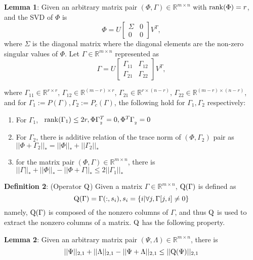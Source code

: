 \documentclass[twoside,leqno,twocolumn]{article}
\begin{document}
\noindent \textbf{Lemma 1}: Given an arbitrary matrix pair $(\Phi,\Gamma)\in{\mathbb{R}^{m\times n}}$
with ${\rm {rank}}(\Phi)=r$, and the SVD of $\Phi$ is 
\[
\Phi=U\left[{\begin{array}{cc}
\Sigma & 0\\
0 & 0
\end{array}}\right]{V^{T}},
\]
where $\varSigma$ is the diagonal matrix where the diagonal elements
are the non-zero singular values of $\Phi$. Let $\Gamma\in{\mathbb{R}^{m\times n}}$
represented as 
\[
\Gamma=U\left[{\begin{array}{cc}
{\Gamma_{11}} & {\Gamma_{12}}\\
{\Gamma_{21}} & {\Gamma_{22}}
\end{array}}\right]{V^{T}},
\]


where $\Gamma_{11}\in{\mathbb{R}^{r\times r}}$, $\Gamma_{12}\in{\mathbb{R}^{(m-r)\times r}}$,
$\Gamma_{21}\in{\mathbb{R}^{r\times(n-r)}}$, $\Gamma_{22}\in{\mathbb{R}^{(m-r)\times(n-r)}}$,
and for $\Gamma_{1}:={P(\Gamma)},\Gamma_{2}:={P_{c}(\Gamma)}$, the
following hold for $\Gamma_{1},\Gamma_{2}$ respectively:
\begin{enumerate}
\item For $\Gamma_{1}$, $\begin{array}{l}
{\rm rank}({\Gamma_{1}})\le2r,\Phi\Gamma_{_{2}}^{T}=0,{\Phi^{T}}\Gamma_{_{2}}^ {}=0\end{array}$
\item For $\Gamma_{2}$, there is additive relation of the trace norm of
$(\Phi,\Gamma_{2})$ pair as $||\Phi+{\Gamma_{2}}|{|_{*}}=||\Phi|{|_{*}}+||{\Gamma_{2}}|{|_{*}}$
\item for the matrix pair $(\Phi,\Gamma)\in{\mathbb{R}^{m\times n}}$, there
is $||\Gamma|{|_{*}}+||\Phi|{|_{*}}-||\Phi+\Gamma|{|_{*}}\le2||{\Gamma_{1}}|{|_{*}}$
\end{enumerate}


\noindent \textbf{Definition 2}: (Operator ${\rm Q}$) Given a matrix $\Gamma\in{\mathbb{R}^{m\times n}}$, ${\rm Q (\Gamma)}$ is defined as
\[{\rm{Q}}(\Gamma ) = \Gamma (:,{s_i}),{s_i} = \left\{ {i|\forall j,\Gamma [j,i] \ne 0} \right\}\]
%
namely, ${\rm Q (\Gamma)}$ is composed of the nonzero columns of $\Gamma$, and thus ${\rm Q}$ is used to extract the nonzero columns of a matrix. ${\rm Q}$ has the following property.

\noindent \textbf{Lemma 2}\cite{mtl:kdd2011:ChenZY11}: Given an arbitrary matrix pair $(\Psi,\Lambda)\in{\mathbb{R}^{m\times n}}$,
there is 
\[||\Psi |{|_{2,1}} + ||\Lambda |{|_{2,1}} - ||\Psi  + \Lambda |{|_{2,1}} \le ||{\rm{Q}}(\Psi )|{|_{2,1}}\]
\end{document}
